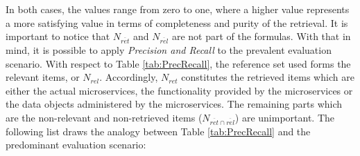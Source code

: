  
\noindent
In both cases, the values range from zero to one, where a higher value represents a more satisfying value in terms of completeness and purity of the retrieval.
It is important to notice that $N_{\overline{ret}}$ and $N_{\overline{rel}}$ are not part of the formulas. With that in mind, it is possible to apply \textit{Precision and Recall} to the prevalent evaluation scenario. With respect to Table \ref{tab:PrecRecall}, the reference set used forms the relevant items, or $N_{rel}$. Accordingly, $N_{ret}$ constitutes the retrieved items which are either the actual microservices, the functionality provided by the microservices or the data objects administered by the microservices.
The remaining parts which are the non-relevant and non-retrieved items ($N_{\overline{ret}\cap \overline{rel}}$) are unimportant. The following list draws the analogy between Table \ref{tab:PrecRecall} and the predominant evaluation scenario:
